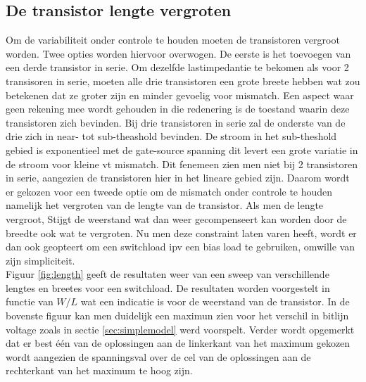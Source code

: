 \subsection{De transistor lengte vergroten}\label{sec:finaleload}
Om de variabiliteit onder controle te houden moeten de transistoren vergroot worden. Twee opties worden hiervoor overwogen. De eerste is het toevoegen van een derde transistor in serie. Om dezelfde lastimpedantie te bekomen als voor 2 transisoren in serie, moeten alle drie transistoren een grote breete hebben wat zou betekenen dat ze groter zijn en minder gevoelig voor mismatch. Een aspect waar geen rekening mee wordt gehouden in die redenering is de toestand waarin deze transistoren zich bevinden. Bij drie transistoren in serie zal de onderste van de drie zich in near- tot sub-theashold bevinden. De stroom in het sub-theshold gebied is exponentieel met de gate-source spanning dit levert een grote variatie in de stroom voor kleine vt mismatch. Dit fenemeen zien men niet bij 2 transistoren in serie, aangezien de transistoren hier in het lineare gebied zijn. Daarom wordt er gekozen voor een tweede optie om de mismatch onder controle te houden namelijk het vergroten van de lengte van de transistor. Als men de lengte vergroot, Stijgt de weerstand wat dan weer gecompenseert kan worden door de breedte ook wat te vergroten. Nu men deze constraint laten varen heeft, wordt er dan ook geopteert om een switchload ipv een bias load te gebruiken, omwille van zijn simpliciteit.\\
Figuur \ref{fig:length} geeft de resultaten weer van een sweep van verschillende lengtes en breetes voor een switchload. De resultaten worden voorgestelt in functie van $W/L$ wat een indicatie is voor de weerstand van de transistor. In de bovenste figuur kan men duidelijk een maximun zien voor het verschil in bitlijn voltage zoals in sectie \ref{sec:simplemodel} werd voorspelt. Verder wordt opgemerkt dat er best \'{e}\'{e}n van de oplossingen aan de linkerkant van het maximum gekozen wordt aangezien de spanningsval over de cel van de oplossingen aan de rechterkant van het maximum te hoog zijn.
